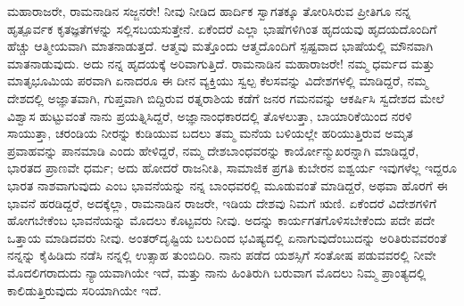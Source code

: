ಮಹಾರಾಜರೇ, ರಾಮನಾಡಿನ ಸಜ್ಜನರೇ! ನೀವು ನೀಡಿದ ಹಾರ್ದಿಕ ಸ್ವಾಗತಕ್ಕೂ ತೋರಿಸಿರುವ ಪ್ರೀತಿಗೂ ನನ್ನ ಹೃತ್ಪೂರ್ವಕ ಕೃತಜ್ಞತೆಗಳನ್ನು ಸಲ್ಲಿಸಬಯಸುತ್ತೇನೆ. ಏಕೆಂದರೆ ಎಲ್ಲಾ ಭಾಷೆಗಳಿಗಿಂತ ಹೃದಯವು ಹೃದಯದೊಂದಿಗೆ ಹೆಚ್ಚು ಆತ್ಮೀಯವಾಗಿ ಮಾತನಾಡುತ್ತದೆ. ಆತ್ಮವು ಮತ್ತೊಂದು ಆತ್ಮದೊಂದಿಗೆ ಸ್ಪಷ್ಟವಾದ ಭಾಷೆಯಲ್ಲಿ ಮೌನವಾಗಿ ಮಾತನಾಡುವುದು. ಅದು ನನ್ನ ಹೃದಯಕ್ಕೆ ಅರಿವಾಗುತ್ತಿದೆ. ರಾಮನಾಡಿನ ಮಹಾರಾಜರೇ! ನಮ್ಮ ಧರ್ಮದ ಮತ್ತು ಮಾತೃಭೂಮಿಯ ಪರವಾಗಿ ಏನಾದರೂ ಈ ದೀನ ವ್ಯಕ್ತಿಯು ಸ್ವಲ್ಪ ಕೆಲಸವನ್ನು ವಿದೇಶಗಳಲ್ಲಿ ಮಾಡಿದ್ದರೆ, ನಮ್ಮ ದೇಶದಲ್ಲಿ ಅಜ್ಞಾತವಾಗಿ, ಗುಪ್ತವಾಗಿ ಬಿದ್ದಿರುವ ರತ್ನರಾಶಿಯ ಕಡೆಗೆ ಜನರ ಗಮನವನ್ನು ಆಕರ್ಷಿಸಿ ಸ್ವದೇಶದ ಮೇಲೆ ವಿಶ್ವಾಸ ಹುಟ್ಟುವಂತೆ ನಾನು ಪ್ರಯತ್ನಿಸಿದ್ದರೆ, ಅಜ್ಞಾನಾಂಧಕಾರದಲ್ಲಿ ತೊಳಲುತ್ತಾ, ಬಾಯಾರಿಕೆಯಿಂದ ನರಳಿ ಸಾಯುತ್ತಾ, ಚರಂಡಿಯ ನೀರನ್ನು ಕುಡಿಯುವ ಬದಲು ತಮ್ಮ ಮನೆಯ ಬಳಿಯಲ್ಲೇ ಹರಿಯುತ್ತಿರುವ ಅಮೃತ ಪ್ರವಾಹವನ್ನು ಪಾನಮಾಡಿ ಎಂದು ಹೇಳಿದ್ದರೆ, ನಮ್ಮ ದೇಶಬಾಂಧವರನ್ನು ಕಾರ್ಯೋನ್ಮುಖರನ್ನಾಗಿ ಮಾಡಿದ್ದರೆ, ಭಾರತದ ಪ್ರಾಣವೇ ಧರ್ಮ; ಅದು ಹೋದರೆ ರಾಜನೀತಿ, ಸಾಮಾಜಿಕ ಪ್ರಗತಿ ಕುಬೇರನ ಐಶ್ವರ್ಯ ಇವುಗಳೆಲ್ಲ ಇದ್ದರೂ ಭಾರತ ನಾಶವಾಗುವುದು ಎಂಬ ಭಾವನೆಯನ್ನು ನನ್ನ ಬಾಂಧವರಲ್ಲಿ ಮೂಡುವಂತೆ ಮಾಡಿದ್ದರೆ, ಅಥವಾ ಹೊರಗೆ ಈ ಭಾವನೆ ಹರಡಿದ್ದರೆ, ಅದಕ್ಕೆಲ್ಲಾ, ರಾಮನಾಡಿನ ರಾಜರೇ, ಇಡಿಯ ದೇಶವು ನಿಮಗೆ ಋಣಿ. ಏಕೆಂದರೆ ವಿದೇಶಗಳಿಗೆ ಹೋಗಬೇಕೆಂಬ ಭಾವನೆಯನ್ನು ಮೊದಲು ಕೊಟ್ಟವರು ನೀವು. ಅದನ್ನು ಕಾರ್ಯಗತಗೊಳಿಸಬೇಕೆಂದು ಪದೇ ಪದೇ ಒತ್ತಾಯ ಮಾಡಿದವರು ನೀವು. ಅಂತರ್​ದೃಷ್ಟಿಯ ಬಲದಿಂದ ಭವಿಷ್ಯದಲ್ಲಿ ಏನಾಗುವುದೆಂಬುದನ್ನು ಅರಿತಿರುವವರಂತೆ ನನ್ನನ್ನು ಕೈಹಿಡಿದು ನಡೆಸಿ ನನ್ನಲ್ಲಿ ಉತ್ಸಾಹ ತುಂಬಿದಿರಿ. ನಾನು ಪಡೆದ ಯಶಸ್ಸಿಗೆ ಸಂತೋಷ ಪಡುವವರಲ್ಲಿ ನೀವೇ ಮೊದಲಿಗ\-ರಾದುದು ನ್ಯಾಯವಾಗಿಯೇ ಇದೆ, ಮತ್ತು ನಾನು ಹಿಂತಿರುಗಿ ಬರುವಾಗ ಮೊದಲು ನಿಮ್ಮ ಪ್ರಾಂತ್ಯದಲ್ಲಿ ಕಾಲಿಡುತ್ತಿರುವುದು ಸರಿಯಾಗಿಯೇ ಇದೆ.

